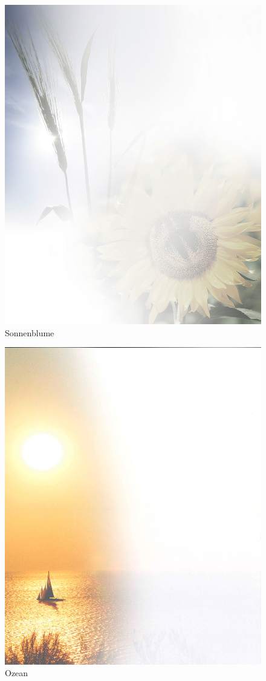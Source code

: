 \documentclass[ngerman,a4paper,11pt]{scrreprt}
\begin{document}
\begin{figure}[H]
\centering
\includegraphics[width=\textwidth,height=.8\textheight,keepaspectratio]{Bilder/Bilder/750_0010_7300_Hintergrund_Sonnenblume_Todesanzeige.png}
\caption{\label{img_Sonnenblume}Sonnenblume}
\end{figure}

\begin{figure}[H]
\centering
\includegraphics[width=\textwidth,height=.8\textheight,keepaspectratio]{Bilder/Bilder/750_0010_7431_Hintergrund_Sehnsucht_Todesanzeige_1.png}
\caption{\label{img_Ozean}Ozean}
\end{figure}
\end{document}
